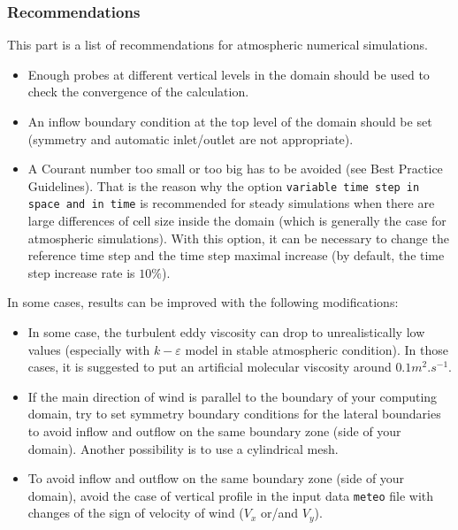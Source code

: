 {{\subsubsection{Recommendations}\label{subsubsec:recommendations}
%
This part is a list of recommendations for atmospheric numerical simulations.
%
\begin{itemize}
\item Enough probes at different vertical levels in the domain should be used
to check the convergence of the calculation.
\item An inflow boundary condition at the top level of the domain should be set
(symmetry and automatic inlet/outlet are not appropriate).
\item A Courant number too small or too big has to be avoided (see \CS Best
Practice Guidelines). That is the reason why the option \texttt{variable time
step in space and in time} is recommended for steady simulations when there are
large differences of cell size inside the domain (which is generally the case
for atmospheric simulations). With this option, it can be necessary to change
the reference time step and the time step maximal increase (by default, the time
step increase rate is $10\%$).
\end{itemize}
%
In some cases, results can be improved with the following modifications:
%
\begin{itemize}
\item In some case, the turbulent eddy viscosity can drop to unrealistically low
values (especially with $k-\varepsilon$ model in stable atmospheric condition).
In those cases, it is suggested to put an artificial molecular viscosity around
$0.1 m^{2}.s^{-1}$.
\item If the main direction of wind is parallel to the boundary of your computing
domain, try to set symmetry boundary conditions for the lateral boundaries to
avoid inflow and outflow on the same boundary zone (side of your domain).
Another possibility is to use a cylindrical mesh.
\item To avoid inflow and outflow on the same boundary zone (side of your domain),
avoid the case of vertical profile in the input data \texttt{meteo} file with
changes of the sign of velocity of wind ($V_x$ or/and $V_y$).
\end{itemize}


}}

